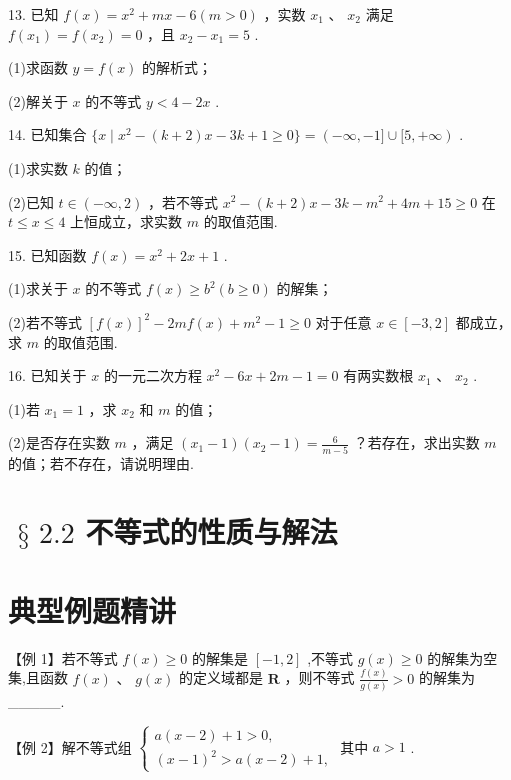 13. 已知 $f\left( x\right)  = {x}^{2} + {mx} - 6\left( {m > 0}\right)$ ，实数 ${x}_{1}$ 、 ${x}_{2}$ 满足 $f\left( {x}_{1}\right)  = f\left( {x}_{2}\right)  = 0$ ，且 ${x}_{2} - {x}_{1} = 5$ .

(1)求函数 $y = f\left( x\right)$ 的解析式；

(2)解关于 $x$ 的不等式 $y < 4 - {2x}$ .

14. 已知集合 $\{ x \mid  {x}^{2} - \left( {k + 2}\right) x - {3k} + 1 \geq  0\}  = \left( {-\infty , - 1\rbrack \cup \lbrack 5, + \infty }\right)$ .

(1)求实数 $k$ 的值；

(2)已知 $t \in  \left( {-\infty ,2}\right)$ ，若不等式 ${x}^{2} - \left( {k + 2}\right) x - {3k} - {m}^{2} + {4m} + {15} \geq  0$ 在 $t \leq  x \leq  4$ 上恒成立，求实数 $m$ 的取值范围.

15. 已知函数 $f\left( x\right)  = {x}^{2} + {2x} + 1$ .

(1)求关于 $x$ 的不等式 $f\left( x\right)  \geq  {b}^{2}\left( {b \geq  0}\right)$ 的解集；

(2)若不等式 ${\left\lbrack  f\left( x\right) \right\rbrack  }^{2} - {2mf}\left( x\right)  + {m}^{2} - 1 \geq  0$ 对于任意 $x \in  \left\lbrack  {-3,2}\right\rbrack$ 都成立，求 $m$ 的取值范围.

16. 已知关于 $x$ 的一元二次方程 ${x}^{2} - {6x} + {2m} - 1 = 0$ 有两实数根 ${x}_{1}$ 、 ${x}_{2}$ .

(1)若 ${x}_{1} = 1$ ，求 ${x}_{2}$ 和 $m$ 的值；

(2)是否存在实数 $m$ ，满足 $\left( {{x}_{1} - 1}\right) \left( {{x}_{2} - 1}\right)  = \frac{6}{m - 5}$ ？若存在，求出实数 $m$ 的值；若不存在，请说明理由.

\section*{$\text{ § }{2.2}$ 不等式的性质与解法}

\section*{典型例题精讲}

【例 1】若不等式 $f\left( x\right)  \geq  0$ 的解集是 $\left\lbrack  {-1,2}\right\rbrack$ ,不等式 $g\left( x\right)  \geq  0$ 的解集为空集,且函数 $f\left( x\right) \text{ 、 }g\left( x\right)$ 的定义域都是 $\mathbf{R}$ ，则不等式 $\frac{f\left( x\right) }{g\left( x\right) } > 0$ 的解集为\_\_\_\_\_.

【例 2】解不等式组 $\left\{  \begin{array}{l} a\left( {x - 2}\right)  + 1 > 0, \\  {\left( x - 1\right) }^{2} > a\left( {x - 2}\right)  + 1, \end{array}\right.$ 其中 $a > 1$ .

